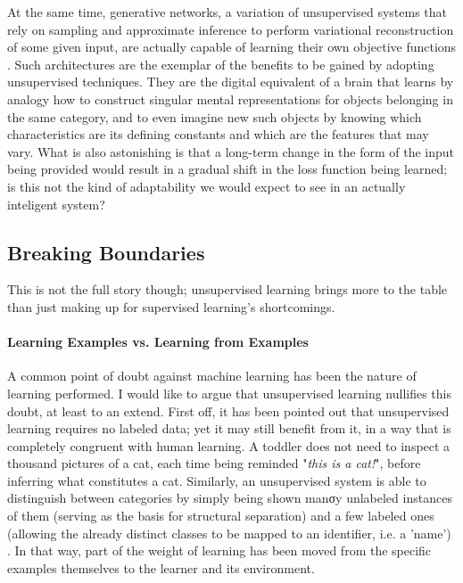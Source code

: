 \documentclass[]{article}
\begin{document}
At the same time, generative networks, a variation of unsupervised systems that rely on sampling and approximate inference to perform variational reconstruction of some given input, are actually capable of learning their own objective functions \cite{goodfellow2014generative, kingma2013auto}. Such architectures are the exemplar of the benefits to be gained by adopting unsupervised techniques. They are the digital equivalent of a brain that learns by analogy how to construct singular mental representations for objects belonging in the same category, and to even imagine new such objects by knowing which characteristics are its defining constants and which are the features that may vary. What is also astonishing is that a long-term change in the form of the input being provided would result in a gradual shift in the loss function being learned; is this not the kind of adaptability we would expect to see in an actually inteligent system?

\subsection{Breaking Boundaries}
This is not the full story though; unsupervised learning brings more to the table than just making up for supervised learning's shortcomings. 

\paragraph{Learning Examples vs. Learning from Examples} A common point of doubt against machine learning has been the nature of learning performed. I would like to argue that unsupervised learning nullifies this doubt, at least to an extend. First off, it has been pointed out that unsupervised learning requires no labeled data; yet it may still benefit from it, in a way that is completely congruent with human learning. A toddler does not need to inspect a thousand pictures of a cat, each time being reminded "\textit{this is a cat!}", before inferring what constitutes a cat. Similarly, an unsupervised system is able to distinguish between categories by simply being shown manσy unlabeled instances of them (serving as the basis for structural separation) and a few labeled ones (allowing the already distinct classes to be mapped to an identifier, i.e. a 'name') \cite{Fei-Fei:2006:OLO:1115692.1115783}. In that way, part of the weight of learning has been moved from the specific examples themselves to the learner and its environment.
\end{document}
